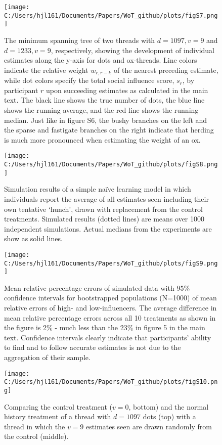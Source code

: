 \documentclass[9pt,twoside,lineno]{pnas-new}
\begin{document}
\begin{figure}
\centering
\texttt{[image: C:/Users/hjl161/Documents/Papers/WoT\_github/plots/figS7.png]}
\caption{The minimum spanning tree of two threads with $d=1097, v=9$ and $d=1233, v=9$, respectively, showing the development of individual estimates along the y-axis for dots and ox-threads. Line colors indicate the relative weight $w_{r,r-k}$ of the nearest preceding estimate, while dot colors specify the total social influence score, $s_r$, by participant $r$ upon succeeding estimates as calculated in the main text. The black line shows the true number of dots, the blue line shows the running average, and the red line shows the running median. Just like in figure S6, the bushy branches on the left and the sparse and fastigate branches on the right indicate that herding is much more pronounced when estimating the weight of an ox.}
\end{figure}

\begin{figure}
\centering
\texttt{[image: C:/Users/hjl161/Documents/Papers/WoT\_github/plots/figS8.png]}
\caption{Simulation results of a simple naïve learning model in which individuals report the average of all estimates seen including their own tentative ‘hunch’, drawn with replacement from the control treatments. Simulated results (dotted lines) are means over 1000 independent simulations. Actual medians from the experiments are show as solid lines.}
\end{figure}

\begin{figure}
\centering
\texttt{[image: C:/Users/hjl161/Documents/Papers/WoT\_github/plots/figS9.png]}
\caption{Mean relative percentage errors of simulated data with 95\% confidence intervals for bootstrapped populations (N=1000) of mean relative errors of high- and low-influencers. The average difference in mean relative percentage errors across all 10 treatments as shown in the figure is 2\% - much less than the 23\% in figure 5 in the main text. Confidence intervals clearly indicate that participants’ ability to find and to follow accurate estimates is not due to the aggregation of their sample.}
\end{figure}

\begin{figure}
\centering
\texttt{[image: C:/Users/hjl161/Documents/Papers/WoT\_github/plots/figS10.png]}
\caption{Comparing the control treatment ($v=0$, bottom) and the normal history treatment of a thread with $d=1097$ dots (top) with a thread in which the $v=9$ estimates seen are drawn randomly from the control (middle).}
\end{figure}
\end{document}
